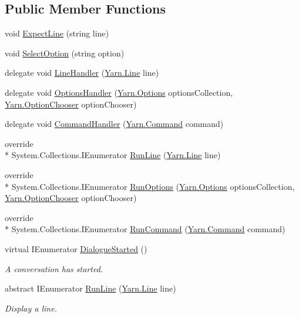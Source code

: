 \subsection*{Public Member Functions}
\begin{DoxyCompactItemize}
\item 
void \hyperlink{a00171_af51a4e0d00f92dcc991f6c1ac62ac8c3}{Expect\-Line} (string line)
\item 
void \hyperlink{a00171_adc743ade599769e968fecea525add7b3}{Select\-Option} (string option)
\item 
delegate void \hyperlink{a00171_ac6c30953edbd1cd4181e2a3854a1642b}{Line\-Handler} (\hyperlink{a00051_a00377}{Yarn.\-Line} line)
\item 
delegate void \hyperlink{a00171_a7fe2e6bc2d5471d9af14a9d35de821bd}{Options\-Handler} (\hyperlink{a00051_a00380}{Yarn.\-Options} options\-Collection, \hyperlink{a00051_a39866cbb03c03a35805d598b5d4ad553}{Yarn.\-Option\-Chooser} option\-Chooser)
\item 
delegate void \hyperlink{a00171_afc93c5cf370b31eceab3671c9eca0d94}{Command\-Handler} (\hyperlink{a00051_a00373}{Yarn.\-Command} command)
\item 
override \\*
System.\-Collections.\-I\-Enumerator \hyperlink{a00171_ae274e39b640908d04aacc6cf6624d9da}{Run\-Line} (\hyperlink{a00051_a00377}{Yarn.\-Line} line)
\item 
override \\*
System.\-Collections.\-I\-Enumerator \hyperlink{a00171_ad2ac83f91814d8666482bf8b6f3721d1}{Run\-Options} (\hyperlink{a00051_a00380}{Yarn.\-Options} options\-Collection, \hyperlink{a00051_a39866cbb03c03a35805d598b5d4ad553}{Yarn.\-Option\-Chooser} option\-Chooser)
\item 
override \\*
System.\-Collections.\-I\-Enumerator \hyperlink{a00171_a01e67009071f9ee5ac5ef3c970cd3695}{Run\-Command} (\hyperlink{a00051_a00373}{Yarn.\-Command} command)
\item 
virtual I\-Enumerator \hyperlink{a00095_af9d88ca81ac536d43046ca6572e3ff54}{Dialogue\-Started} ()
\begin{DoxyCompactList}\small\item\em A conversation has started. \end{DoxyCompactList}\item 
abstract I\-Enumerator \hyperlink{a00095_a754c6dd0bc67895d11f878fe4477d698}{Run\-Line} (\hyperlink{a00051_a00377}{Yarn.\-Line} line)
\begin{DoxyCompactList}\small\item\em Display a line. \end{DoxyCompactList}\item 

\end{DoxyCompactItemize}
